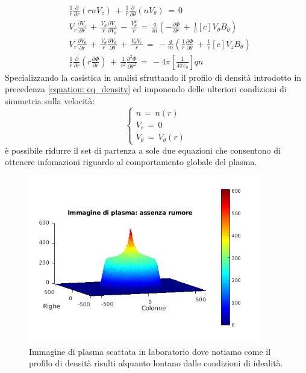 \begin{align}   %
    & \frac{1}{r}\frac{\partial}{\partial r}\left(rnV_z\right)\,+\,\frac{1}{r}\frac{\partial}{\partial \theta}\left(nV_\theta\right)\,=\,0 \\
    & V_r\frac{\partial V_z}{\partial r}\,+\,\frac{V_\theta}{r}\frac{\partial V_z}{\partial V_\theta}\,-\,\frac{V^2_\theta}{r}\,=\,\frac{q}{m}\left(-\frac{\partial \Phi}{\partial r}\,+\,\frac{1}{c}\left[c\right]V_\theta B_\theta\right) \\
    & V_r\frac{\partial V_\theta}{\partial r}\,+\,\frac{V_\theta}{r}\frac{\partial V_\theta}{\partial \theta}\,+\,\frac{V_\theta V_r}{r}\,=\,-\frac{q}{m}\left(\frac{1}{r}\frac{\partial \Phi}{\partial \theta}\,+\,\frac{1}{c}\left[c\right]V_zB_\theta\right) \\
    & \frac{1}{r}\frac{\partial}{\partial r}\left(r\frac{\partial \Phi}{\partial r}\right)\,+\,\frac{1}{r^2}\frac{\partial^2\Phi}{\partial \theta ^2}\,=\,-4\pi\left[\frac{1}{4\pi\varepsilon_0}\right]qn
\end{align}
Specializzando la casistica in analisi sfruttando il profilo di densità introdotto in precedenza \eqref{equation: eq_density} ed imponendo 
delle ulteriori condizioni di simmetria sulla velocità:
\begin{equation}
\begin{cases}
    n\,=\,n\left(r\right) \\
    V_r\,=\,0   \\
    V_\theta\,=\,V_\theta\left(r\right)
\end{cases}
\end{equation}
è possibile ridurre il set di partenza a sole due equazioni che consentono di ottenere infomazioni riguardo al comportamento 
globale del plasma. 
\begin{figure}[H]
    \centering
    \includegraphics[width=0.9\textwidth]{Immagini/RealPlasma.jpg}
    \caption{Immagine di plasma scattata in laboratorio dove notiamo come il profilo di densità risulti alquanto lontano dalle
    condizioni di idealità. }
    \label{figure: RealPlasma}
\end{figure}
